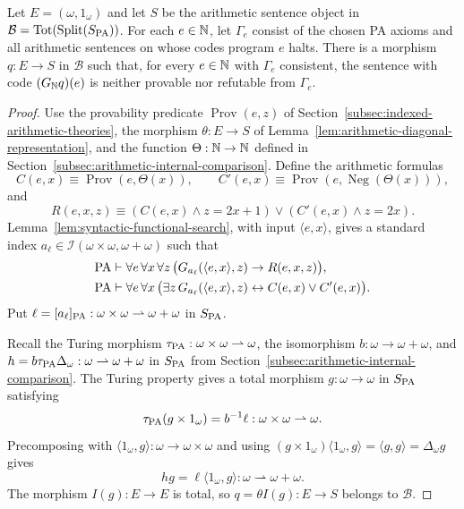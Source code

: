 \begin{theorem}
\label{thm:uniform-independent-sentences}
Let $E=(\omega,1_\omega)$ and let $S$ be the arithmetic sentence
object in $\mathcal B=\operatorname{Tot}(\operatorname{Split}(S_{\mathrm{PA}}))$. For each $e\in\mathbb N$,
let $\Gamma_e$ consist of the chosen PA axioms and all arithmetic
sentences on whose codes program $e$ halts. There is a morphism
$q:E\to S$ in $\mathcal B$ such that, for every $e\in\mathbb N$ with
$\Gamma_e$ consistent, the
sentence with code $(G_{\mathbb N}q)(e)$ is neither provable nor
refutable from $\Gamma_e$.
\end{theorem}
\begin{proof}
Use the provability predicate $\operatorname{Prov}(e,z)$ of
Section~\ref{subsec:indexed-arithmetic-theories}, the morphism
$\theta:E\to S$ of Lemma~\ref{lem:arithmetic-diagonal-representation},
and the function $\Theta:\mathbb N\to\mathbb N$ defined in
Section~\ref{subsec:arithmetic-internal-comparison}.
Define the arithmetic formulas
\[
 C(e,x)\equiv\operatorname{Prov}(e,\Theta(x)),\qquad
 C'(e,x)\equiv\operatorname{Prov}(e,\operatorname{Neg}(\Theta(x))),
\]
and
\[
 R(e,x,z)\equiv
   (C(e,x)\land z=2x+1)\lor(C'(e,x)\land z=2x).
\]
Lemma~\ref{lem:syntactic-functional-search}, with input
$\langle e,x\rangle$, gives a standard index
$a_\ell\in\mathcal I(\omega\times\omega,\omega+\omega)$
such that
\[
 \begin{aligned}
 \mathrm{PA}&\vdash\forall e\,\forall x\,\forall z\,
   \bigl(G_{a_\ell}(\langle e,x\rangle,z)\to R(e,x,z)\bigr),\\
 \mathrm{PA}&\vdash\forall e\,\forall x\,
   \bigl(\exists z\,G_{a_\ell}(\langle e,x\rangle,z)
                     \leftrightarrow C(e,x)\lor C'(e,x)\bigr).
 \end{aligned}
\]
Put $\ell=[a_\ell]_{\mathrm{PA}}:\omega\times\omega\rightharpoonup
\omega+\omega$ in $S_{\mathrm{PA}}$.

Recall the Turing morphism
$\tau_{\mathrm{PA}}:\omega\times\omega\rightharpoonup\omega$,
the isomorphism $b:\omega\to\omega+\omega$, and
$h=b\tau_{\mathrm{PA}}\Delta_\omega:\omega\rightharpoonup\omega+\omega$
in $S_{\mathrm{PA}}$ from Section~\ref{subsec:arithmetic-internal-comparison}.
The Turing property gives a total morphism
$g:\omega\to\omega$ in $S_{\mathrm{PA}}$ satisfying
\[
 \tau_{\mathrm{PA}}(g\times1_\omega)=b^{-1}\ell:
                    \omega\times\omega\rightharpoonup\omega.
\]
Precomposing with $\langle1_\omega,g\rangle:\omega\to\omega\times\omega$
and using $(g\times1_\omega)\langle1_\omega,g\rangle
=\langle g,g\rangle=\Delta_\omega g$ gives
\[
 hg=\ell\langle1_\omega,g\rangle:
                  \omega\rightharpoonup\omega+\omega.
\]
The morphism $I(g):E\to E$ is total, so
$q=\theta I(g):E\to S$ belongs to $\mathcal B$.


\end{proof}
